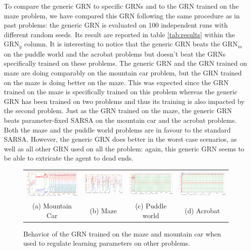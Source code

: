To compare the generic GRN to specific GRNs and to the GRN trained on the maze problem, we have compared this GRN following the same procedure as in past problems: the generic GRN is evaluated on 100 independent runs with different random seeds. Its result are reported in table \ref{tab:results} within the GRN$_g$ column. It is interesting to notice that the generic GRN beats the GRN$_m$ on the puddle world and the acrobat problems but doesn't beat the GRNs specifically trained on these problems. The generic GRN and the GRN trained on maze are doing comparably on the mountain car problem, but the GRN trained on the maze is doing better on the maze. This was expected since the GRN trained on the maze is specifically trained on this problem whereas the generic GRN has been trained on two problems and thus its training is also impacted by the second problem. Just as the GRN trained on the maze, the generic GRN beats parameter-fixed SARSA on the mountain car and the acrobat problems. Both the maze and the puddle world problems are in favour to the standard SARSA. However, the generic GRN does better in the worst case scenarios, as well as all other GRN used on all the problem: again, this generic GRN seems to be able to extricate the agent to dead ends.

\begin{figure}[t!]
\center
\setlength{\tabcolsep}{1mm}
\begin{tabular}{cccc}
\includegraphics[width=0.24\linewidth]{MC_GRNGenericBehavior.pdf} &
\includegraphics[width=0.24\linewidth]{MZ_GRNGenericBehavior.pdf} &
\includegraphics[width=0.24\linewidth]{PW_GRNGenericBehavior.pdf} &
\includegraphics[width=0.24\linewidth]{ACP_GRNGenericBehavior.pdf} \\
(a) Mountain Car & (b) Maze & (c) Puddle world & (d) Acrobat
\end{tabular}
\caption{Behavior of the GRN trained on the maze and mountain car when used to regulate learning parameters on other problems.}\label{fig:GRNGenericBehavior}
\end{figure}


